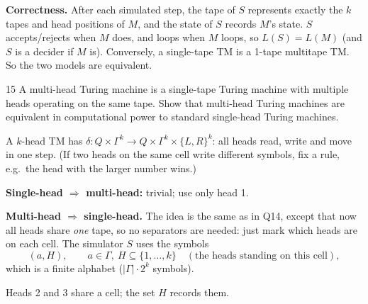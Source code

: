 \begin{soln}
\textbf{Correctness.} After each simulated step, the tape of $S$ represents exactly the $k$ tapes and head positions of $M$, and the state of $S$ records $M$'s state. $S$ accepts/rejects when $M$ does, and loops when $M$ loops, so $L(S)=L(M)$ (and $S$ is a decider if $M$ is). Conversely, a single-tape TM is a 1-tape multitape TM. So the two models are equivalent.
\end{soln}

\begin{question}{15}
A multi-head Turing machine is a single-tape Turing machine with multiple heads operating on the same tape. Show that multi-head Turing machines are equivalent in computational power to standard single-head Turing machines.
\end{question}
\begin{soln}
A $k$-head TM has $\delta:Q\times\Gamma^k\to Q\times\Gamma^k\times\{L,R\}^k$: all heads read, write and move in one step. (If two heads on the same cell write different symbols, fix a rule, e.g.\ the head with the larger number wins.)

\textbf{Single-head $\Rightarrow$ multi-head:} trivial; use only head 1.

\textbf{Multi-head $\Rightarrow$ single-head.} The idea is the same as in Q14, except that now all heads share \emph{one} tape, so no separators are needed: just mark which heads are on each cell. The simulator $S$ uses the symbols
\[
(a,H),\qquad a\in\Gamma,\ H\subseteq\{1,\dots,k\}\quad(\text{the heads standing on this cell}),
\]
which is a finite alphabet ($|\Gamma|\cdot 2^k$ symbols).

\begin{center}

{\footnotesize Heads 2 and 3 share a cell; the set $H$ records them.}
\end{center}


\end{soln}
